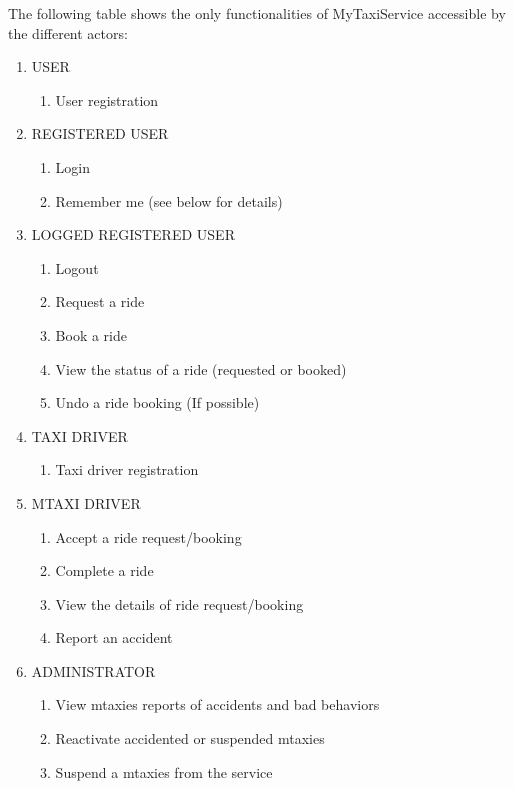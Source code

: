 \documentclass[11pt,titlepage]{article} %
\begin{document}
      The following table shows the only functionalities of MyTaxiService accessible by
      the different actors:
      \begin{enumerate}
	      \item USER
		\begin{enumerate}
		      \item User registration
		\end{enumerate}

	      \item REGISTERED USER
		\begin{enumerate}
		      \item Login
		      \item Remember me (see below for details)
		\end{enumerate}

	      \item LOGGED REGISTERED USER
		\begin{enumerate}
		      \item Logout
		      \item Request a ride
		      \item Book a ride
		      \item View the status of a ride (requested or booked)
		      \item Undo a ride booking (If possible)
		\end{enumerate}


	      \item TAXI DRIVER
		\begin{enumerate}
		      \item Taxi driver registration
		\end{enumerate}

	      \item MTAXI DRIVER
		\begin{enumerate}
		      \item Accept a ride request/booking
		      \item Complete a ride
		      \item View the details of ride request/booking
		      \item Report an accident
		\end{enumerate}

	      \item ADMINISTRATOR
		 \begin{enumerate}
			\item View mtaxies reports of accidents and bad behaviors
			\item Reactivate accidented or suspended mtaxies
      \item Suspend a mtaxies from the service
		\end{enumerate}


\end{enumerate}
\end{document}
